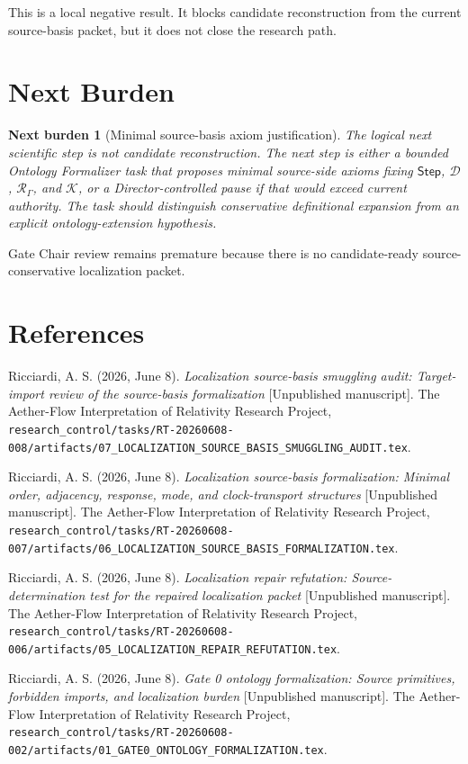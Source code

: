 \documentclass[11pt]{article}
\newcommand{\Step}{\mathsf{Step}}
\newcommand{\RespAlg}{\mathcal{R}_{\Gamma}}
\newtheorem{nextburden}{Next burden}
\begin{document}
This is a local negative result. It blocks candidate reconstruction from the
current source-basis packet, but it does not close the research path.

\section{Next Burden}

\begin{nextburden}[Minimal source-basis axiom justification]
The logical next scientific step is not candidate reconstruction. The next
step is either a bounded Ontology Formalizer task that proposes minimal
source-side axioms fixing \(\Step\), \(\mathcal{D}\), \(\RespAlg\), and
\(\mathcal{K}\), or a Director-controlled pause if that would exceed current
authority. The task should distinguish conservative definitional expansion
from an explicit ontology-extension hypothesis.
\end{nextburden}

Gate Chair review remains premature because there is no candidate-ready
source-conservative localization packet.

\section*{References}

Ricciardi, A. S. (2026, June 8). \emph{Localization source-basis smuggling
audit: Target-import review of the source-basis formalization} [Unpublished
manuscript]. The Aether-Flow Interpretation of Relativity Research Project,
\texttt{research\_control/tasks/RT-20260608-008/artifacts/07\_LOCALIZATION\_SOURCE\_BASIS\_SMUGGLING\_AUDIT.tex}.

Ricciardi, A. S. (2026, June 8). \emph{Localization source-basis
formalization: Minimal order, adjacency, response, mode, and clock-transport
structures} [Unpublished manuscript]. The Aether-Flow Interpretation of
Relativity Research Project,
\texttt{research\_control/tasks/RT-20260608-007/artifacts/06\_LOCALIZATION\_SOURCE\_BASIS\_FORMALIZATION.tex}.

Ricciardi, A. S. (2026, June 8). \emph{Localization repair refutation:
Source-determination test for the repaired localization packet} [Unpublished
manuscript]. The Aether-Flow Interpretation of Relativity Research Project,
\texttt{research\_control/tasks/RT-20260608-006/artifacts/05\_LOCALIZATION\_REPAIR\_REFUTATION.tex}.

Ricciardi, A. S. (2026, June 8). \emph{Gate 0 ontology formalization: Source
primitives, forbidden imports, and localization burden} [Unpublished
manuscript]. The Aether-Flow Interpretation of Relativity Research Project,
\texttt{research\_control/tasks/RT-20260608-002/artifacts/01\_GATE0\_ONTOLOGY\_FORMALIZATION.tex}.
\end{document}
